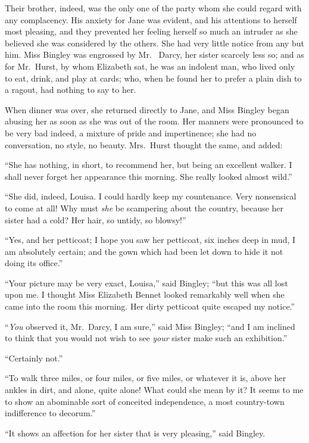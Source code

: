 Their brother, indeed, was the only one of the party whom she
could regard with any complacency.  His anxiety for Jane was
evident, and his attentions to herself most pleasing, and
they prevented her feeling herself so much an intruder as she
believed she was considered by the others.  She had very little
notice from any but him.  Miss Bingley was engrossed by Mr.\ %
Darcy, her sister scarcely less so; and as for Mr.\ Hurst, by
whom Elizabeth sat, he was an indolent man, who lived only to
eat, drink, and play at cards; who, when he found her to prefer
a plain dish to a ragout, had nothing to say to her.

When dinner was over, she returned directly to Jane, and Miss
Bingley began abusing her as soon as she was out of the room.
Her manners were pronounced to be very bad indeed, a mixture
of pride and impertinence; she had no conversation, no style, no
beauty.  Mrs.\ Hurst thought the same, and added:

``She has nothing, in short, to recommend her, but being an
excellent walker.  I shall never forget her appearance this
morning.  She really looked almost wild.''

``She did, indeed, Louisa.  I could hardly keep my countenance.
Very nonsensical to come at all!  Why must \emph{she} be scampering
about the country, because her sister had a cold?  Her hair, so
untidy, so blowsy!''

``Yes, and her petticoat; I hope you saw her petticoat, six inches
deep in mud, I am absolutely certain; and the gown which had
been let down to hide it not doing its office.''

``Your picture may be very exact, Louisa,'' said Bingley; ``but
this was all lost upon me.  I thought Miss Elizabeth Bennet
looked remarkably well when she came into the room this
morning.  Her dirty petticoat quite escaped my notice.''

``\emph{You} observed it, Mr.\ Darcy, I am sure,'' said Miss Bingley;
``and I am inclined to think that you would not wish to see
\emph{your} sister make such an exhibition.''

``Certainly not.''

``To walk three miles, or four miles, or five miles, or whatever it
is, above her ankles in dirt, and alone, quite alone!  What could
she mean by it?  It seems to me to show an abominable sort of
conceited independence, a most country-town indifference to
decorum.''

``It shows an affection for her sister that is very pleasing,'' said
Bingley.

